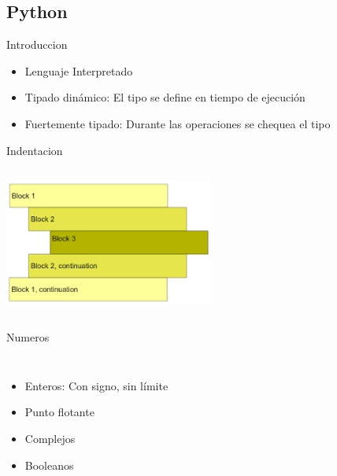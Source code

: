  \subsection{Python}
 \begin{frame}{Introduccion}
 \begin{itemize}
    \item{Lenguaje Interpretado}
    \item{Tipado dinámico: El tipo se define en tiempo de ejecución}
    \item{Fuertemente tipado: Durante las operaciones se chequea el tipo}
 \end{itemize}
    \vfill
 \end{frame}
 \begin{frame}{Indentacion}
    \begin{columns}[onlytextwidth]
       \center\includegraphics[width=0.9\textwidth]{python/indentado}
       
    \end{columns}
    \vfill
 \end{frame}
 \begin{frame}{Numeros}
    \begin{columns}[onlytextwidth]
       \begin{itemize}
          \item{Enteros: Con signo, sin límite}
          \item{Punto flotante}
          \item{Complejos}
          \item{Booleanos}
       \end{itemize}
       
    \end{columns}
    \vfill
 \end{frame}
